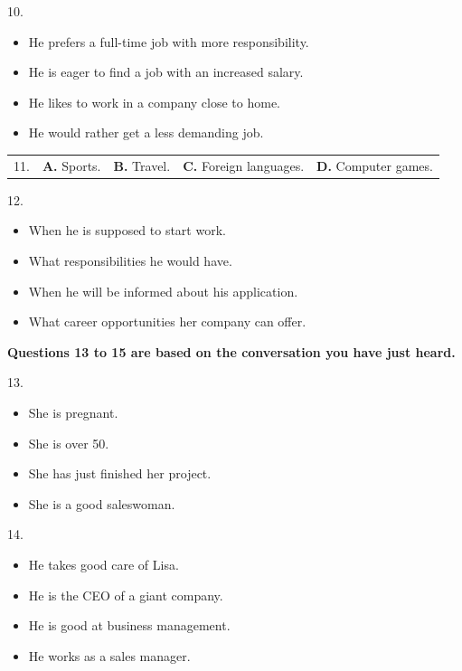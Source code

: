 \documentclass[UTF8,11pt]{ctexart}
\begin{document}
10.


\begin{itemize}[leftmargin=2em,itemsep=.2em,topsep=.4em]\item[A.] He prefers a full-time job with more responsibility.
\item[B.] He is eager to find a job with an increased salary.
\item[C.] He likes to work in a company close to home.
\item[D.] He would rather get a less demanding job.
\end{itemize}

\noindent\begin{tabularx}{\linewidth}{@{}lXXXX@{}}11. & \textbf{A.} Sports. & \textbf{B.} Travel. & \textbf{C.} Foreign languages. & \textbf{D.} Computer games.\\\end{tabularx}\par

12.


\begin{itemize}[leftmargin=2em,itemsep=.2em,topsep=.4em]\item[A.] When he is supposed to start work.
\item[B.] What responsibilities he would have.
\item[C.] When he will be informed about his application.
\item[D.] What career opportunities her company can offer.
\end{itemize}

\textbf{Questions 13 to 15 are based on the conversation you have just heard.}


13.


\begin{itemize}[leftmargin=2em,itemsep=.2em,topsep=.4em]\item[A.] She is pregnant.
\item[B.] She is over 50.
\item[C.] She has just finished her project.
\item[D.] She is a good saleswoman.
\end{itemize}

14.


\begin{itemize}[leftmargin=2em,itemsep=.2em,topsep=.4em]\item[A.] He takes good care of Lisa.
\item[B.] He is the CEO of a giant company.
\item[C.] He is good at business management.
\item[D.] He works as a sales manager.
\end{itemize}
\end{document}
